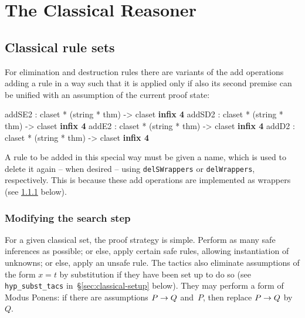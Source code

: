 
\chapter{The Classical Reasoner}\label{chap:classical}
\newcommand\ainfer[2]{\begin{array}{r@{\,}l}#2\\ \hline#1\end{array}}

\section{Classical rule sets}

For elimination and destruction rules there are variants of the add operations
adding a rule in a way such that it is applied only if also its second premise
can be unified with an assumption of the current proof state:
\begin{ttbox}
addSE2      : claset * (string * thm) -> claset           \hfill{\bf infix 4}
addSD2      : claset * (string * thm) -> claset           \hfill{\bf infix 4}
addE2       : claset * (string * thm) -> claset           \hfill{\bf infix 4}
addD2       : claset * (string * thm) -> claset           \hfill{\bf infix 4}
\end{ttbox}
\begin{warn}
  A rule to be added in this special way must be given a name, which is used 
  to delete it again -- when desired -- using \texttt{delSWrappers} or 
  \texttt{delWrappers}, respectively. This is because these add operations
  are implemented as wrappers (see \ref{sec:modifying-search} below).
\end{warn}


\subsection{Modifying the search step}
\label{sec:modifying-search}
For a given classical set, the proof strategy is simple.  Perform as many safe
inferences as possible; or else, apply certain safe rules, allowing
instantiation of unknowns; or else, apply an unsafe rule.  The tactics also
eliminate assumptions of the form $x=t$ by substitution if they have been set
up to do so (see \texttt{hyp_subst_tacs} in~{\S}\ref{sec:classical-setup} below).
They may perform a form of Modus Ponens: if there are assumptions $P\rightarrow Q$
and~$P$, then replace $P\rightarrow Q$ by~$Q$.

